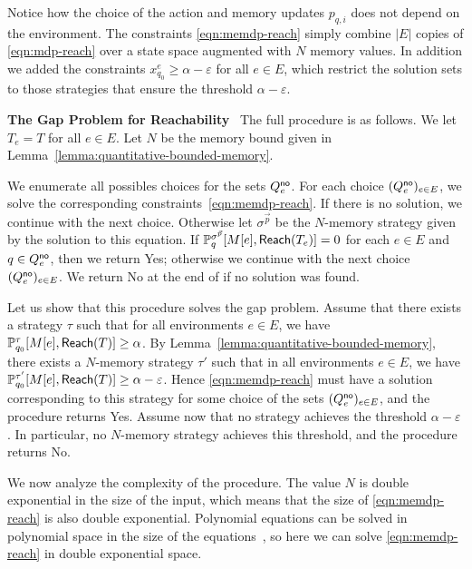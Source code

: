 \documentclass[a4paper,USenglish,cleveref, autoref, thm-restate]{lipics-v2021}
\let\epsilon\varepsilon
\def\abs#1{\ensuremath{\lvert #1 \rvert}}
\def\myparagraph#1{\noindent\textbf{#1}~}
\newcommand*{\pr}{\mathbb{P}}
\newcommand\Reach{\textrm{\sf Reach}}
\begin{document}
Notice how the choice of the action and memory updates $p_{q,i}$ does not depend on the environment.
The constraints \eqref{eqn:memdp-reach} simply combine $\abs{E}$ copies of \eqref{eqn:mdp-reach}
over a state space augmented with $N$ memory values. In addition 
we added the constraints $x_{q_0}^e \geq \alpha-\epsilon$ for all $e \in E$, 
which restrict the solution sets to those strategies that ensure the threshold $\alpha-\epsilon$.

\smallskip
\myparagraph{The Gap Problem for Reachability}
The full procedure is as follows. We let $T_e = T$ for all $e \in E$.
Let $N$ be the memory bound given in Lemma~\ref{lemma:quantitative-bounded-memory}.

We enumerate all possibles choices for the sets $Q^{\textsf{no}}_e$.
For each choice $(Q^{\textsf{no}}_e)_{e\in E}$, we solve the corresponding constraints~\eqref{eqn:memdp-reach}.
If there is no solution, we continue with the next choice.
Otherwise let $\sigma^{\vec{p}}$ be the $N$-memory strategy given by the solution to this equation.
If $\pr_q^{\sigma^{\vec{p}}}[M[e], \Reach(T_e)] = 0$ for each $e \in E$ and $q \in Q^{\textsf{no}}_e$, 
then we return \textsf{Yes};
otherwise we continue with the next choice $(Q^{\textsf{no}}_e)_{e\in E}$. 
We return \textsf{No} at the end of if no solution was found.

Let us show that this procedure solves the gap problem.
Assume that there exists a strategy $\tau$ such that for all environments $e \in E$, 
we have $\pr_{q_0}^{\tau}[M[e],\Reach(T)]\geq \alpha$.
By Lemma~\ref{lemma:quantitative-bounded-memory}, there exists a $N$-memory strategy $\tau'$ 
such that in all environments $e \in E$, we have $\pr_{q_0}^{\tau'}[M[e],\Reach(T)]\geq \alpha-\epsilon$.
Hence \eqref{eqn:memdp-reach} must have a solution corresponding to this strategy for some choice of the sets $(Q^{\textsf{no}}_e)_{e\in E}$, and
the procedure returns \textsf{Yes}.
Assume now that no strategy achieves the threshold $\alpha-\epsilon$. In particular, no $N$-memory strategy
achieves this threshold, and the procedure returns \textsf{No}.

We now analyze the complexity of the procedure.
The value $N$ is double exponential in the size of the input, which means that the size of \eqref{eqn:memdp-reach} is also double exponential.
Polynomial equations can be solved in polynomial space in the size of the equations~\cite{Canny-stoc1988},
so here we can solve \eqref{eqn:memdp-reach} in double exponential space.
\end{document}
